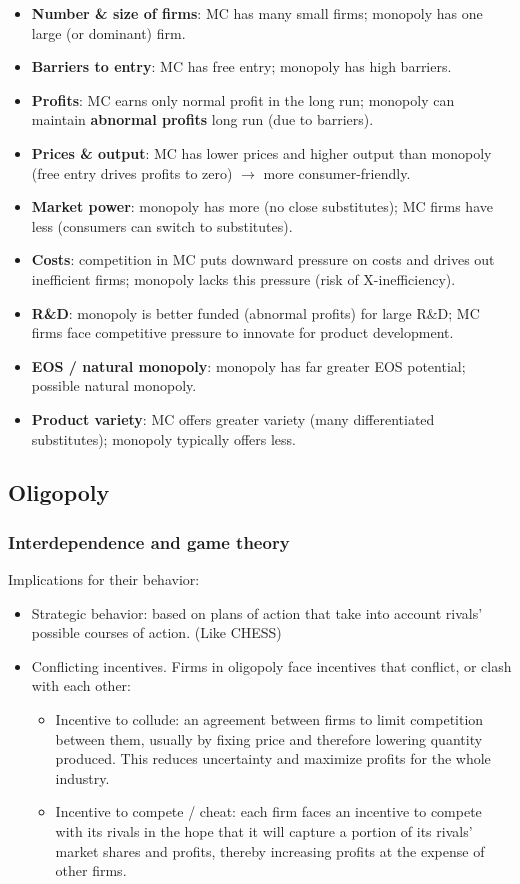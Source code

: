 \begin{itemize}
  \item \textbf{Number \& size of firms}: MC has many small firms; monopoly has one large (or dominant) firm.
  \item \textbf{Barriers to entry}: MC has free entry; monopoly has high barriers.
  \item \textbf{Profits}: MC earns only normal profit in the long run; monopoly can maintain \textbf{abnormal profits} long run (due to barriers).
  \item \textbf{Prices \& output}: MC has lower prices and higher output than monopoly (free entry drives profits to zero) $\to$ more consumer-friendly.
  \item \textbf{Market power}: monopoly has more (no close substitutes); MC firms have less (consumers can switch to substitutes).
  \item \textbf{Costs}: competition in MC puts downward pressure on costs and drives out inefficient firms; monopoly lacks this pressure (risk of X-inefficiency).
  \item \textbf{R\&D}: monopoly is better funded (abnormal profits) for large R\&D; MC firms face competitive pressure to innovate for product development.
  \item \textbf{EOS / natural monopoly}: monopoly has far greater EOS potential; possible natural monopoly.
  \item \textbf{Product variety}: MC offers greater variety (many differentiated substitutes); monopoly typically offers less.
\end{itemize}
\subsection{Oligopoly}
\subsubsection*{Interdependence and game theory}
Implications for their behavior:
\begin{itemize}
  \item Strategic behavior: based on plans of action that take into account rivals' possible courses of action. (Like CHESS) 
  \item Conflicting incentives. Firms in oligopoly face incentives that conflict, or clash with each other:
  \begin{itemize}
    \item Incentive to collude: an agreement between firms to limit competition between them, usually by fixing price and therefore lowering quantity produced. This reduces uncertainty and maximize profits for the whole industry.
    \item Incentive to compete / cheat: each firm faces an incentive to compete with its rivals in the hope that it will capture a portion of its rivals’ market shares and profits, thereby increasing profits at the expense of other firms. 
  \end{itemize}
\end{itemize}
